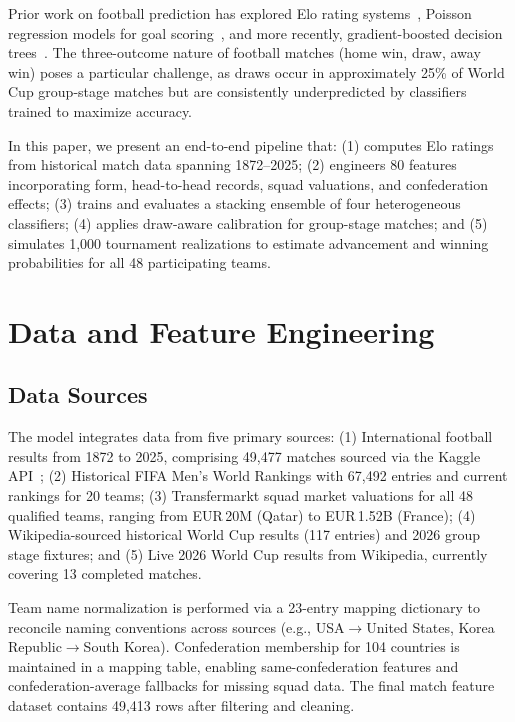 \documentclass[11pt,a4paper]{article}
\newcommand{\Elo}{Elo}
\begin{document}
Prior work on football prediction has explored \Elo{} rating systems~\cite{elo1978}, Poisson regression models for goal scoring~\cite{dixon1997}, and more recently, gradient-boosted decision trees~\cite{berrar2019}. The three-outcome nature of football matches (home win, draw, away win) poses a particular challenge, as draws occur in approximately 25\% of World Cup group-stage matches but are consistently underpredicted by classifiers trained to maximize accuracy.

In this paper, we present an end-to-end pipeline that: (1) computes \Elo{} ratings from historical match data spanning 1872--2025; (2) engineers 80 features incorporating form, head-to-head records, squad valuations, and confederation effects; (3) trains and evaluates a stacking ensemble of four heterogeneous classifiers; (4) applies draw-aware calibration for group-stage matches; and (5) simulates 1,000 tournament realizations to estimate advancement and winning probabilities for all 48 participating teams.

\section{Data and Feature Engineering}
\label{sec:data}

\subsection{Data Sources}
\label{sec:data:sources}

The model integrates data from five primary sources: (1) International football results from 1872 to 2025, comprising 49,477 matches sourced via the Kaggle API~\cite{martj42}; (2) Historical FIFA Men's World Rankings with 67,492 entries and current rankings for 20 teams; (3) Transfermarkt squad market valuations for all 48 qualified teams, ranging from EUR\,20M (Qatar) to EUR\,1.52B (France); (4) Wikipedia-sourced historical World Cup results (117 entries) and 2026 group stage fixtures; and (5) Live 2026 World Cup results from Wikipedia, currently covering 13 completed matches.

Team name normalization is performed via a 23-entry mapping dictionary to reconcile naming conventions across sources (e.g., USA$\to$United States, Korea Republic$\to$South Korea). Confederation membership for 104 countries is maintained in a mapping table, enabling same-confederation features and confederation-average fallbacks for missing squad data. The final match feature dataset contains 49,413 rows after filtering and cleaning.
\end{document}
